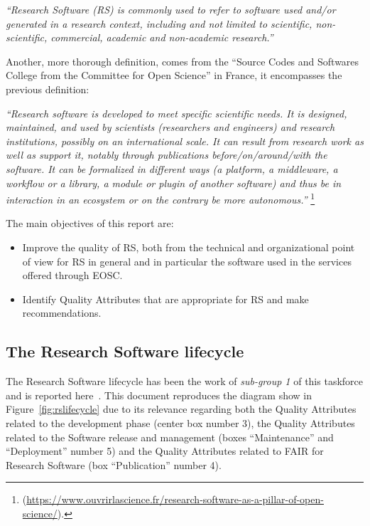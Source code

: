 \textit{``Research Software (RS) is commonly used to refer to software used and/or generated in a research context, including and not limited to scientific, non-scientific, commercial, academic and non-academic research.''}

Another, more thorough definition, comes from the ``Source Codes and Softwares College from the Committee for Open Science'' in France, it encompasses the previous definition:

\textit{``Research software is developed to meet specific scientific needs. It is designed, maintained, and used by scientists (researchers and engineers) and research institutions, possibly on an international scale. It can result from research work as well as support it, notably through publications before/on/around/with the software. It can be formalized in different ways (a platform, a middleware, a workflow or a library, a module or plugin of another software) and thus be in interaction in an ecosystem or on the contrary be more autonomous.''} \footnote{(\url{https://www.ouvrirlascience.fr/research-software-as-a-pillar-of-open-science/}).}

\label{def_rs}

The main objectives of this report are:

\begin{itemize}
    \item Improve the quality of RS, both from the technical and organizational point of view for RS in general and in particular the software used in the services offered through EOSC.
    \item Identify Quality Attributes that are appropriate for RS and make recommendations.
\end{itemize}

\subsection{The Research Software lifecycle}

The Research Software lifecycle has been the work of \textit{sub-group 1} of this taskforce and is reported here~\cite{sg1tf2023}. This document reproduces the diagram show in Figure~\ref{fig:rslifecycle} due to its relevance regarding both the Quality Attributes related to the development phase (center box number 3), the Quality Attributes related to the Software release and management (boxes ``Maintenance'' and ``Deployment'' number 5) and the Quality Attributes related to FAIR for Research Software (box ``Publication'' number 4).

